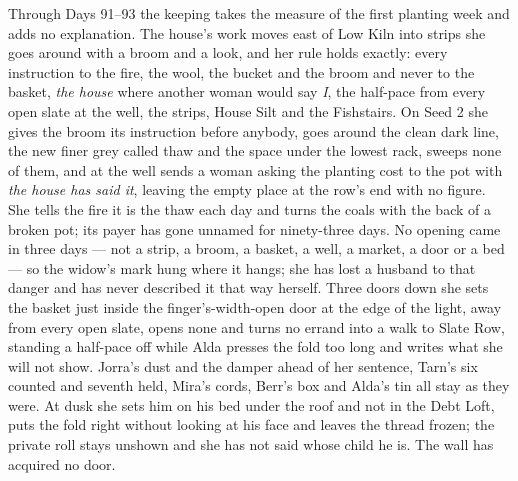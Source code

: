 \documentclass{design/chronicle}
\begin{document}
{Through Days 91–93 the keeping takes the measure of the first planting week and adds no explanation. The house’s work moves east of Low Kiln into strips she goes around with a broom and a look, and her rule holds exactly: every instruction to the fire, the wool, the bucket and the broom and never to the basket, \emph{the house} where another woman would say \emph{I}, the half-pace from every open slate at the well, the strips, House Silt and the Fishstairs. On Seed 2 she gives the broom its instruction before anybody, goes around the clean dark line, the new finer grey called thaw and the space under the lowest rack, sweeps none of them, and at the well sends a woman asking the planting cost to the pot with \emph{the house has said it}, leaving the empty place at the row’s end with no figure. She tells the fire it is the thaw each day and turns the coals with the back of a broken pot; its payer has gone unnamed for ninety-three days. No opening came in three days --- not a strip, a broom, a basket, a well, a market, a door or a bed --- so the widow’s mark hung where it hangs; she has lost a husband to that danger and has never described it that way herself. Three doors down she sets the basket just inside the finger’s-width-open door at the edge of the light, away from every open slate, opens none and turns no errand into a walk to Slate Row, standing a half-pace off while Alda presses the fold too long and writes what she will not show. Jorra’s dust and the damper ahead of her sentence, Tarn’s six counted and seventh held, Mira’s cords, Berr’s box and Alda’s tin all stay as they were. At dusk she sets him on his bed under the roof and not in the Debt Loft, puts the fold right without looking at his face and leaves the thread frozen; the private roll stays unshown and she has not said whose child he is. The wall has acquired no door.

}
\end{document}
